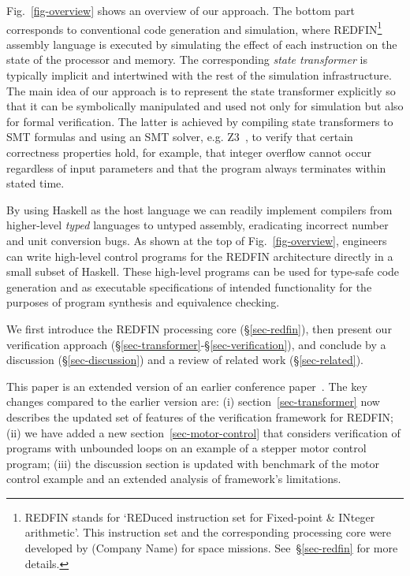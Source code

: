 Fig.~\ref{fig-overview} shows an overview of our approach. The bottom part
corresponds to conventional code generation and simulation, where
REDFIN\footnote{REDFIN stands for `REDuced instruction set for Fixed-point \&
INteger arithmetic'. This instruction set and the corresponding processing core
were developed by (Company Name) for space missions.
See~\S\ref{sec-redfin} for more details.} assembly language is executed by
simulating the effect of each instruction on the state of the processor and memory.
The corresponding \emph{state transformer} is typically implicit and intertwined
with the rest of the simulation infrastructure. The main idea of our approach is
to represent the state transformer explicitly so that it can be symbolically
manipulated and used not only for simulation but also for formal verification.
The latter is achieved by compiling state transformers to SMT formulas and using
an SMT solver, e.g. Z3~\cite{de2008z3}, to verify that certain correctness
properties hold, for example, that integer overflow cannot occur regardless of
input parameters and that the program always terminates within stated time.

By using Haskell as the host language we can readily implement compilers from
higher-level \emph{typed} languages to untyped assembly, eradicating incorrect
number and unit conversion bugs. As shown at the top of Fig.~\ref{fig-overview},
engineers can write high-level control programs for the REDFIN architecture
directly in a small subset of Haskell. These high-level programs can be used for
type-safe code generation and as executable specifications of intended
functionality for the purposes of program synthesis and equivalence checking.


We first introduce the REDFIN processing core (\S\ref{sec-redfin}), then
present our verification approach (\S\ref{sec-transformer}-\S\ref{sec-verification}),
and conclude by a discussion (\S\ref{sec-discussion}) and a review of related
work (\S\ref{sec-related}).

This paper is an extended version of an earlier conference
paper~\cite{redfin-hs-19}. The key changes compared to the earlier
version are: (i) section~\ref{sec-transformer} now describes the
updated set of features of the verification framework for REDFIN;
(ii) we have added a new section~\ref{sec-motor-control} that
considers verification of programs with unbounded loops on an
example of a stepper motor control program; (iii) the discussion
section is updated with benchmark of the motor control example and
an extended analysis of framework's limitations.